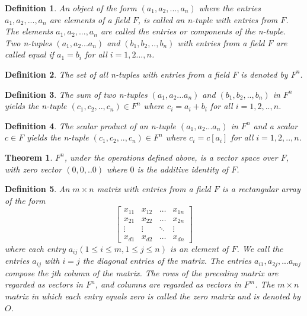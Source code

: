 \documentclass[a4paper]{article}
\newtheorem{mytheorem}{Theorem}
\newtheorem{mydef}{Definition}
\numberwithin{mytheorem}{section}
\numberwithin{mydef}{section}
\numberwithin{example}{section}
\begin{document}
\begin{mydef} An object of the form $(a_{1},a_{2},...,a_{n})$ where the entries $a_{1},a_{2},...,a_{n}$ are elements of a field $F$, is called an n-tuple with entries from $F$. The elements $a_{1},a_{2},...,a_{n}$  are called the entries or components of the n-tuple. Two n-tuples $(a_{1},a_{2}...a_{n})$ and $(b_{1},b_{2},..,b_{n})$ with entries from a field $F$ are called equal if $a_{1} = b_{i}$ for all $i = 1,2...,n$. 
\end{mydef}

\begin{mydef} The set of all n-tuples with entries from a field $F$ is denoted by $F^{n}$.
\end{mydef}

\begin{mydef} The sum of two n-tuples $(a_{1},a_{2}...a_{n})$ and $(b_{1},b_{2},..,b_{n})$ in $F^{n}$ yields the n-tuple $(c_{1},c_{2},..,c_{n}) \in F^{n}$ where $c_{i} = a_{i}+b_{i}$ for all $i = 1,2,..,n$.  
\end{mydef}

\begin{mydef} The scalar product of an n-tuple $(a_{1},a_{2}...a_{n})$ in $F^{n}$ and a scalar $c \in F$ yields the n-tuple $(c_{1},c_{2},..,c_{n}) \in F^{n}$ where $c_{i} = c[a_{i}] $ for all $i = 1,2,..,n$.  
\end{mydef}

\begin{mytheorem} $F^{n}$, under the operations defined above, is a vector space over $F$, with zero vector $(0,0,..0)$ where $0$ is the additive identity of $F$. \end{mytheorem}

\begin{mydef} An $m \times n$ matrix with entries from a field $F$ is a rectangular array of the form 
\[
\begin{bmatrix}
    x_{11}       & x_{12}  & \dots & x_{1n} \\
    x_{21}       & x_{22} & \dots & x_{2n} \\
    \vdots & \vdots & \ddots & \vdots \\
    x_{d1}       & x_{d2} & \dots & x_{dn}
\end{bmatrix}
\] 
where each entry $a_{ij} (1 \leq i \leq m, 1 \leq j \leq n)$ is an element of $F$. We  call the entries $a_{ij}$ with $i = j$ the diagonal entries of the matrix. The entries $a_{i1},a_{2j},...a_{mj}$ compose the jth column of the matrix. The rows of the preceding matrix are regarded as vectors in $F^{n}$, and columns are regarded as vectors in $F^{m}$. The $m \times n$ matrix in which each entry equals zero is called the zero matrix and is denoted by $O$. 
\end{mydef}
\end{document}
